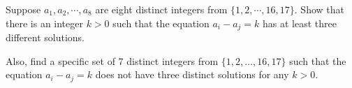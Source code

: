 Suppose $a_1,a_2,\cdots,a_8$ are eight distinct integers from $\{1,2,\cdots,16,17\}$.  Show that there is an integer $k > 0$ such that the equation $a_i - a_j = k$ has at least three different solutions.

Also, find a specific set of 7 distinct integers from $\{1,2,\ldots,16,17\}$ such that the equation $a_i - a_j = k$ does not have three distinct solutions for any $k > 0$.